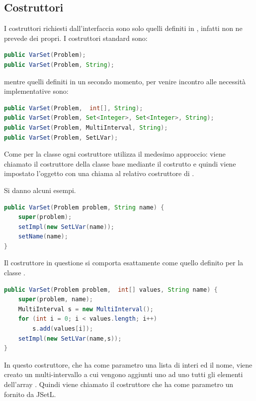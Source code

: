 \subsection{Costruttori}
I costruttori richiesti dall'interfaccia sono solo quelli definiti in
, infatti  non ne prevede dei propri. I 
costruttori standard sono:
\begin{lstlisting}[language = Java,
                   frame = single]
public VarSet(Problem);
public VarSet(Problem, String);
\end{lstlisting}
mentre quelli definiti in un secondo momento, per venire incontro alle 
necessità implementative sono:
\begin{lstlisting}[language = Java,
                   frame = single]
public VarSet(Problem,  int[], String);
public VarSet(Problem, Set<Integer>, Set<Integer>, String);
public VarSet(Problem, MultiInterval, String);
public VarSet(Problem, SetLVar);
\end{lstlisting}

Come per la classe  ogni costruttore utilizza il medesimo
approccio: viene chiamato il costruttore della classe base  mediante il 
costrutto
 e quindi viene impostato l'oggetto  con
una chiama al relativo costruttore di .

Si danno alcuni esempi.

\begin{lstlisting}[language = Java,
                   caption = {un costruttore standard di \files{VarSet}}]
public VarSet(Problem problem, String name) {
	super(problem);
	setImpl(new SetLVar(name));
	setName(name);
}
\end{lstlisting}
Il costruttore in questione si comporta esattamente come quello definito per
la classe .

\begin{lstlisting}[language = Java,
                   caption = {costruttore con lista di interi.}]
public VarSet(Problem problem,  int[] values, String name) {
	super(problem, name);
	MultiInterval s = new MultiInterval();
	for (int i = 0; i < values.length; i++)
		s.add(values[i]);
	setImpl(new SetLVar(name,s));
}
\end{lstlisting}
In questo costruttore, che ha come parametro una lista di interi ed il nome,
viene creato un multi-intervallo a cui vengono aggiunti uno ad uno tutti gli
elementi dell'array . Quindi viene chiamato il costruttore
che ha come parametro un  fornito da JSetL.


